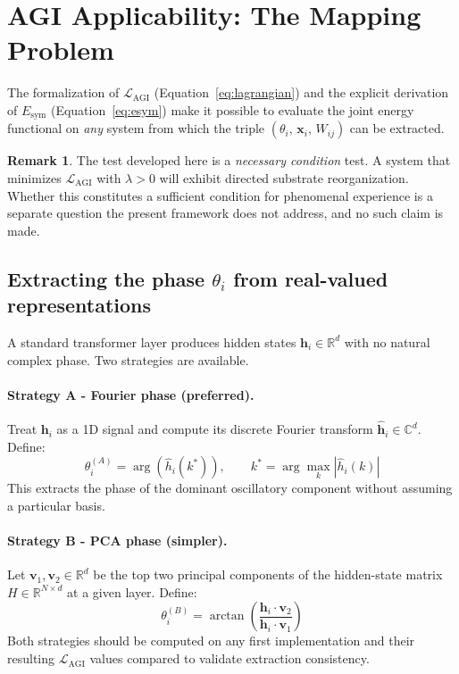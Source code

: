 \documentclass[12pt,a4paper]{article}
\theoremstyle{plain}
\theoremstyle{definition}
\newtheorem{remark}[theorem]{Remark}
\begin{document}
\section{AGI Applicability: The Mapping Problem}
\label{sec:agi_mapping}

The formalization of $\mathcal{L}_{\text{AGI}}$
(Equation~\ref{eq:lagrangian}) and the explicit derivation of
$E_{\text{sym}}$ (Equation~\ref{eq:esym}) make it possible to evaluate
the joint energy functional on \emph{any} system from which the triple
$(\theta_i,\, \mathbf{x}_i,\, W_{ij})$ can be extracted.

\begin{remark}
The test developed here is a \emph{necessary condition} test. A system
that minimizes $\mathcal{L}_{\text{AGI}}$ with $\lambda > 0$ will exhibit
directed substrate reorganization. Whether this constitutes a sufficient
condition for phenomenal experience is a separate question the present
framework does not address, and no such claim is made.
\end{remark}

\subsection{Extracting the phase $\theta_i$ from real-valued
            representations}
\label{subsec:phase_extract}

A standard transformer layer produces hidden states
$\mathbf{h}_i \in \mathbb{R}^d$ with no natural complex phase.
Two strategies are available.

\paragraph{Strategy A - Fourier phase (preferred).}
Treat $\mathbf{h}_i$ as a 1D signal and compute its discrete Fourier
transform $\hat{\mathbf{h}}_i \in \mathbb{C}^d$. Define:
\begin{equation}
\label{eq:theta_fourier}
\theta_i^{(A)} = \arg\!\left(\hat{h}_i\!\left(k^*\right)\right),
\qquad k^* = \arg\max_k \left|\hat{h}_i(k)\right|
\end{equation}
This extracts the phase of the dominant oscillatory component without
assuming a particular basis.

\paragraph{Strategy B - PCA phase (simpler).}
Let $\mathbf{v}_1, \mathbf{v}_2 \in \mathbb{R}^d$ be the top two
principal components of the hidden-state matrix
$H \in \mathbb{R}^{N \times d}$ at a given layer. Define:
\begin{equation}
\label{eq:theta_pca}
\theta_i^{(B)} = \arctan\!\left(
  \frac{\mathbf{h}_i \cdot \mathbf{v}_2}
       {\mathbf{h}_i \cdot \mathbf{v}_1}\right)
\end{equation}
Both strategies should be computed on any first implementation and their
resulting $\mathcal{L}_{\text{AGI}}$ values compared to validate
extraction consistency.
\end{document}
